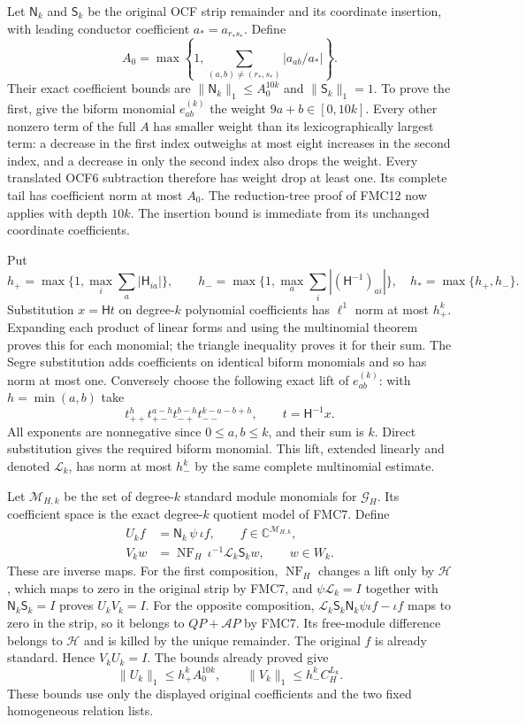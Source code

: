 \documentclass[11pt,a4paper]{article}
\begin{document}
Let $\mathsf N_k$ and $\mathsf S_k$ be the original OCF strip
remainder and its coordinate insertion, with leading conductor
coefficient $a_*=a_{r_*s_*}$. Define
\[
 A_0=\max\left\{1,
                \sum_{(a,b)\ne(r_*,s_*)}|a_{ab}/a_*|\right\}.
 \tag{FMC14}
\]
Their exact coefficient bounds are
$\|\mathsf N_k\|_1\le A_0^{10k}$ and
$\|\mathsf S_k\|_1=1$. To prove the first, give the biform monomial
$e_{ab}^{(k)}$ the weight $9a+b\in[0,10k]$. Every other nonzero
term of the full $A$ has smaller weight than its lexicographically
largest term: a decrease in the first index outweighs at most eight
increases in the second index, and a decrease in only the second
index also drops the weight. Every translated OCF6 subtraction
therefore has weight drop at least one. Its complete tail has
coefficient norm at most $A_0$. The reduction-tree proof of FMC12
now applies with depth $10k$. The insertion bound is immediate
from its unchanged coordinate coefficients.

Put
\[
 h_+=\max\{1,\max_i\sum_a|\mathsf H_{ia}|\},\qquad
 h_-=\max\{1,\max_a\sum_i|(\mathsf H^{-1})_{ai}|\},
 \quad h_* =\max\{h_+,h_-\}.
 \tag{FMC15}
\]
Substitution $x=\mathsf Ht$ on degree-$k$ polynomial coefficients
has $\ell^1$ norm at most $h_+^k$. Expanding each product of linear
forms and using the multinomial theorem proves this for each
monomial; the triangle inequality proves it for their sum. The Segre
substitution adds coefficients on identical biform monomials and so
has norm at most one. Conversely choose the following exact lift
of $e_{ab}^{(k)}$: with $h=\min(a,b)$ take
\[
 t_{++}^{h}t_{+-}^{a-h}t_{-+}^{b-h}t_{--}^{k-a-b+h},
 \qquad t=\mathsf H^{-1}x.
 \tag{FMC16}
\]
All exponents are nonnegative since $0\le a,b\le k$, and their
sum is $k$. Direct substitution gives the required biform monomial.
This lift, extended linearly and denoted $\mathscr L_k$, has norm
at most $h_-^k$ by the same complete multinomial estimate.

Let $\mathscr M_{H,k}$ be the set of degree-$k$ standard module
monomials for $\mathcal G_H$. Its coefficient space is the exact
degree-$k$ quotient model of FMC7. Define
\[
 \begin{split}
 U_k f&=\mathsf N_k\,\psi\,\iota f,\qquad
          f\in\mathbb C^{\mathscr M_{H,k}},\\
 V_k w&=\operatorname{NF}_H\,\iota^{-1}
                        \mathscr L_k\mathsf S_k w,
          \qquad w\in W_k.
 \end{split}\tag{FMC17}
\]
These are inverse maps. For the first composition, $\operatorname{NF}_H$
changes a lift only by $\mathscr H$, which maps to zero in the
original strip by FMC7, and $\psi\mathscr L_k=I$ together with
$\mathsf N_k\mathsf S_k=I$ proves $U_kV_k=I$.
For the opposite composition, $\mathscr L_k\mathsf S_k
\mathsf N_k\psi\iota f-\iota f$ maps to zero in the strip, so
it belongs to $QP+\mathcal AP$ by FMC7. Its free-module difference
belongs to $\mathscr H$ and is killed by the unique remainder.
The original $f$ is already standard. Hence $V_kU_k=I$.
The bounds already proved give
\[
 \|U_k\|_1\le h_+^k A_0^{10k},\qquad
 \|V_k\|_1\le h_-^k C_H^{L_k}.
 \tag{FMC18}
\]
These bounds use only the displayed original coefficients and the
two fixed homogeneous relation lists.
\end{document}
